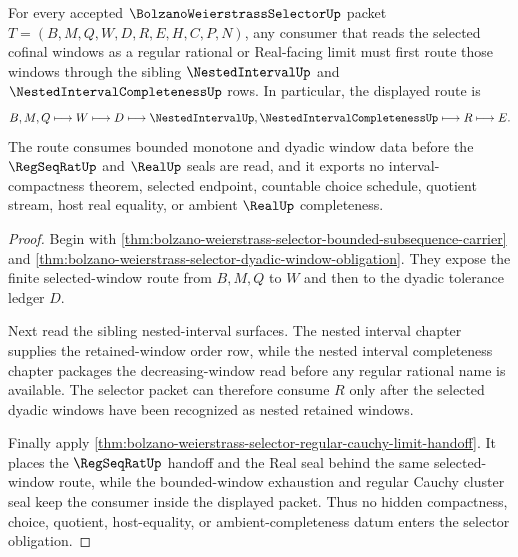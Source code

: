 \begin{theorem}
\label{thm:bolzano-weierstrass-selector-nested-interval-obligation}
For every accepted $\BolzanoWeierstrassSelectorUp$ packet $T=(B,M,Q,W,D,R,E,H,C,P,N)$, any consumer that reads the selected cofinal windows as a regular rational or Real-facing limit must first route those windows through the sibling $\NestedIntervalUp$ and $\NestedIntervalCompletenessUp$ rows. In particular, the displayed route is
$$
B,M,Q\longmapsto W\longmapsto D\longmapsto \NestedIntervalUp,\NestedIntervalCompletenessUp\longmapsto R\longmapsto E.
$$
The route consumes bounded monotone and dyadic window data before the $\RegSeqRatUp$ and $\RealUp$ seals are read, and it exports no interval-compactness theorem, selected endpoint, countable choice schedule, quotient stream, host real equality, or ambient $\RealUp$ completeness.
\end{theorem}
\begin{proof}
Begin with \autoref{thm:bolzano-weierstrass-selector-bounded-subsequence-carrier} and \autoref{thm:bolzano-weierstrass-selector-dyadic-window-obligation}. They expose the finite selected-window route from $B,M,Q$ to $W$ and then to the dyadic tolerance ledger $D$.

Next read the sibling nested-interval surfaces. The nested interval chapter supplies the retained-window order row, while the nested interval completeness chapter packages the decreasing-window read before any regular rational name is available. The selector packet can therefore consume $R$ only after the selected dyadic windows have been recognized as nested retained windows.

Finally apply \autoref{thm:bolzano-weierstrass-selector-regular-cauchy-limit-handoff}. It places the $\RegSeqRatUp$ handoff and the Real seal behind the same selected-window route, while the bounded-window exhaustion and regular Cauchy cluster seal keep the consumer inside the displayed packet. Thus no hidden compactness, choice, quotient, host-equality, or ambient-completeness datum enters the selector obligation.
\end{proof}

